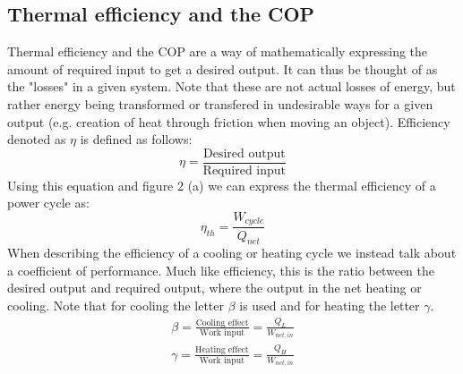 \documentclass[11pt, a4paper]{article}
\begin{document}
\subsection{Thermal efficiency and the COP}
Thermal efficiency and the COP are a way of mathematically expressing the amount of required input to get a desired output. It can thus be thought of as the "losses" in a given system. Note that these are not actual losses of energy, but rather energy being transformed or transfered in undesirable ways for a given output (e.g. creation of heat through friction when moving an object). Efficiency denoted as $\eta$ is defined as follows:
\begin{equation}
  \eta = \frac{\text{Desired output}}{\text{Required input}}
\end{equation}
Using this equation and figure 2 (a) we can express the thermal efficiency of a power cycle as:
\begin{equation}
  \eta_{th} = \frac{W_{cycle}}{Q_{net}}
\end{equation}
When describing the efficiency of a cooling or heating cycle we instead talk about a coefficient of performance. Much like efficiency, this is the ratio between the desired output and required output, where the output in the net heating or cooling. Note that for cooling the letter $\beta$ is used and for heating the letter $\gamma$. 
\begin{gather}
  \beta = \frac{\text{Cooling effect}}{\text{Work input}} = \frac{Q_{L}}{W_{net,in}}\\
  \gamma = \frac{\text{Heating effect}}{\text{Work input}} = \frac{Q_{H}}{W_{net,in}}
\end{gather}
\end{document}
